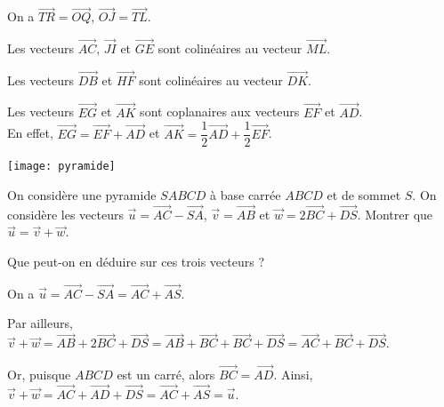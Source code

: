\documentclass[11pt,fleqn, openany]{book} %
\begin{document}
\begin{solution}On a $\overrightarrow{TR}=\overrightarrow{OQ}$,  $\overrightarrow{OJ}=\overrightarrow{TL}$.

Les vecteurs $\overrightarrow{AC}$, $\overrightarrow{JI}$ et $\overrightarrow{GE}$ sont colinéaires au vecteur $\overrightarrow{ML}$.

Les vecteurs $\overrightarrow{DB}$ et $\overrightarrow{HF}$ sont colinéaires au vecteur $\overrightarrow{DK}$.

Les vecteurs $\overrightarrow{EG}$ et $\overrightarrow{AK}$ sont coplanaires aux vecteurs $\overrightarrow{EF}$ et $\overrightarrow{AD}$. \\ En effet, $\overrightarrow{EG}=\overrightarrow{EF}+\overrightarrow{AD}$ et $\overrightarrow{AK}=\dfrac{1}{2}\overrightarrow{AD}+\dfrac{1}{2}\overrightarrow{EF}$.\end{solution}

\begin{exercise}
\hspace{0pt}
\begin{minipage}{0.3\linewidth}
 \begin{center}
\texttt{[image: pyramide]}
\end{center}
\end{minipage}\hfill\begin{minipage}{0.6\linewidth}

On considère une pyramide $SABCD$ à base carrée $ABCD$ et de sommet $S$. 
\vskip5pt
On considère les vecteurs $\vec u = \overrightarrow{AC}-\overrightarrow{SA}$, $\vec v = \overrightarrow{AB}$ et $\vec w = 2\overrightarrow{BC} + \overrightarrow{DS}$. Montrer que $\vec u = \vec v + \vec w$.

Que peut-on en déduire sur ces trois vecteurs ?\end{minipage}\end{exercise}

\begin{solution}
On a $\vec u = \overrightarrow{AC}-\overrightarrow{SA}=\overrightarrow{AC}+\overrightarrow{AS}$.

Par ailleurs, $\vec v + \vec w=\overrightarrow{AB} + 2\overrightarrow{BC} + \overrightarrow{DS}=\overrightarrow{AB} + \overrightarrow{BC} + \overrightarrow{BC}+\overrightarrow{DS}=\overrightarrow{AC}+\overrightarrow{BC}+\overrightarrow{DS}$.

Or, puisque $ABCD$ est un carré, alors $\overrightarrow{BC}=\overrightarrow{AD}$. Ainsi, $\vec v + \vec w = \overrightarrow{AC}+\overrightarrow{AD}+\overrightarrow{DS}=\overrightarrow{AC}
+\overrightarrow{AS}=\vec u$.\end{solution}
\end{document}
